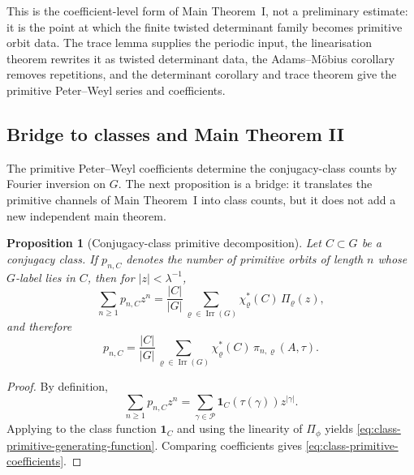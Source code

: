 \documentclass[11pt,a4paper]{amsart}
\theoremstyle{plain}
\newtheorem{proposition}[theorem]{Proposition}
\theoremstyle{definition}
\theoremstyle{remark}
\DeclareMathOperator{\Irr}{Irr}
\newcommand{\cP}{\mathcal P}
\begin{document}
\noindent
This is the coefficient-level form of Main Theorem~I, not a preliminary
estimate: it is the point at which the finite twisted determinant family
becomes primitive orbit data. The trace lemma supplies the periodic
input, the linearisation theorem rewrites it as twisted determinant data,
the Adams--M\"obius corollary removes repetitions, and the determinant
corollary and trace theorem give the primitive Peter--Weyl series and
coefficients.

\subsection{Bridge to classes and Main Theorem II}

The primitive Peter--Weyl coefficients determine the conjugacy-class
counts by Fourier inversion on \(G\). The next proposition is a bridge: it
translates the primitive channels of Main Theorem~I into class counts,
but it does not add a new independent main theorem.

\begin{proposition}[Conjugacy-class primitive decomposition]
  \label{prop:class-primitive-decomposition}
  Let \(C\subset G\) be a conjugacy class. If \(p_{n,C}\) denotes the
  number of primitive orbits of length \(n\) whose \(G\)-label lies in
  \(C\), then for \(|z|<\lambda^{-1}\),
  \begin{equation}\label{eq:class-primitive-generating-function}
    \sum_{n\ge 1}p_{n,C}z^n
    =
    \frac{|C|}{|G|}
      \sum_{\varrho\in\Irr(G)}
        \chi_\varrho^\ast(C)\,\Pi_\varrho(z),
  \end{equation}
  and therefore
  \begin{equation}\label{eq:class-primitive-coefficients}
    p_{n,C}
    =
    \frac{|C|}{|G|}
      \sum_{\varrho\in\Irr(G)}
        \chi_\varrho^\ast(C)\,\pi_{n,\varrho}(A,\tau).
  \end{equation}
\end{proposition}

\begin{proof}
  By definition,
  \[
    \sum_{n\ge 1}p_{n,C}z^n
    =
    \sum_{\gamma\in\cP}\mathbf 1_C(\tau(\gamma))z^{|\gamma|}.
  \]
  Applying  to the class function
  \(\mathbf 1_C\) and using the linearity of \(\Pi_\phi\) yields
  \eqref{eq:class-primitive-generating-function}. Comparing coefficients
  gives \eqref{eq:class-primitive-coefficients}.
\end{proof}
\end{document}
